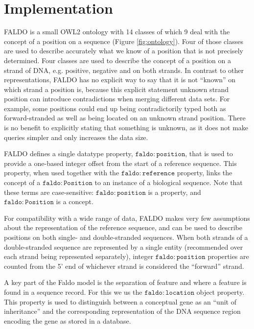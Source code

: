 \section*{Implementation}

FALDO is a small OWL2 ontology with 14 classes of which 9 deal with the concept of a position on a sequence (Figure \ref{fig:ontology}).
Four of those classes are used to describe accurately what we know of a position that is not precisely determined.
Four classes are used to describe the concept of a position on a strand of DNA, e.g. positive, negative and on both strands.
In contrast to other representations, FALDO has no explicit way to say that it is not ``known'' on which strand a position is, because this explicit statement unknown strand position can introduce contradictions when merging different data sets.
For example, some positions could end up being contradictorily typed both as forward-stranded as well as being located on an unknown strand position.
There is no benefit to explicitly stating that something is unknown, as it does not make queries simpler
and only increases the data size.

FALDO defines a single datatype property,
$\mathtt{faldo\colon{}position}$, that is used to provide a one-based
integer offset from the start of a reference sequence.
This property, when used together with the
$\mathtt{faldo\colon{}reference}$ property, links the concept of
a $\mathtt{faldo\colon{}Position}$ to an instance of a biological
sequence.
Note that these terms are case-sensitive:
$\mathtt{faldo\colon{}position}$ is a property, and
$\mathtt{faldo\colon{}Position}$ is a concept.

For compatibility with a wide range of data, FALDO makes very few
assumptions about the representation of the reference sequence, and
can be used to describe positions on both single- and double-stranded
sequences.
When both strands of a double-stranded sequence are represented by a
single entity (recommended over each strand being represented
separately), integer $\mathtt{faldo\colon{}position}$ properties are
counted from the 5' end of whichever strand is considered the
``forward'' strand.

A key part of the Faldo model is the separation of feature and where a feature is found in a sequence record.
For this we us the $\mathtt{faldo\colon{}location}$ object property. 
This property is used to distinguish between a conceptual gene as an ``unit of inheritance'' and the corresponding representation of the DNA sequence region encoding the gene as stored in a database.


